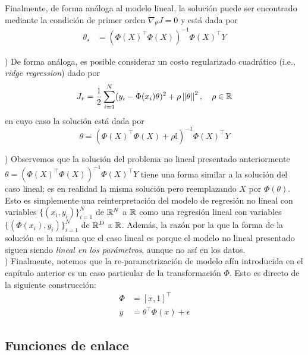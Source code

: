 Finalmente, de forma análoga al modelo lineal, la solución puede ser encontrado mediante la condición de primer orden $\nabla_\theta J=0$ y está dada por 
\begin{align}
    \theta_{\star}&= (\Phi(X)^\top\Phi(X))^{-1}\Phi(X)^\top Y
\end{align}



\begin{mdframed}[style=discusion, frametitle={\center Observaciones}]

) De forma análoga, es posible considerar un costo regularizado cuadrático (i.e., \emph{ridge regression}) dado por 
\begin{equation}
    J_r = \frac{1}{2} \sum_{i=1}^N(y_i - \Phi(x_i)\theta)^2 + \rho\left \| \theta \right \|^2,\quad \rho\in{\mathbb R}
\end{equation}
en cuyo caso la solución está dada por
\begin{equation}
    \theta = (\Phi(X)^\top\Phi(X)+\rho\mathbb{I})^{-1}\Phi(X)^\top Y
\end{equation}


) Observemos que la solución del problema no lineal presentado anteriormente $\theta = (\Phi(X)^\top\Phi(X))^{-1}\Phi(X)^\top Y$ tiene una forma similar a la solución del caso lineal; es en realidad la misma solución pero reemplazando $X$ por $\Phi(\theta)$. Esto es simplemente una reinterpretación del modelo de regresión no lineal con variables $\{(x_i,y_i)\}_{i=1}^N$ de ${\mathbb R}^N$ a ${\mathbb R}$ como una regresión lineal con variables $\{(\Phi(x_i),y_i)\}_{i=1}^N$ de ${\mathbb R}^D$ a ${\mathbb R}$. Además, la razón por la que la forma de la solución es la misma que el caso lineal es porque el modelo no lineal presentado siguen siendo \emph{lineal en los parámetros}, aunque no así en los datos.\\

) Finalmente, notemos que la re-parametrización de modelo afín introducida en el capítulo anterior  es un caso particular de la transformación $\Phi$. Esto es directo de la siguiente construcción:
\begin{align*}
    \Phi &= [x, 1]^\top\\
    y &= \theta^\top\Phi(x)+ \epsilon 
\end{align*}

\end{mdframed}





\subsection{Funciones de enlace}

